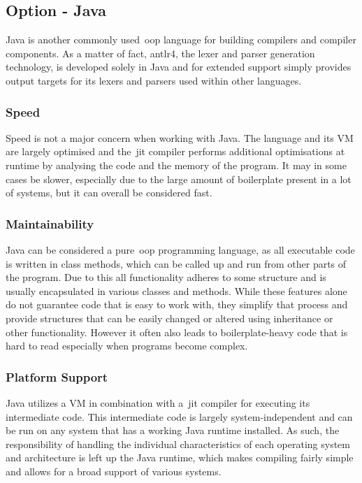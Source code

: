 \subsection{Option - Java}
\label{sec:programming-language-option-java}

Java is another commonly used~\acrshort{oop} language for building compilers and compiler components. As a matter of fact, \Gls{antlr4}, the lexer and parser generation technology, is developed solely in Java and for extended support simply provides output targets for its lexers and parsers used within other languages.

\subsubsection{Speed}

Speed is not a major concern when working with Java. The language and its VM are largely optimised and the~\acrshort{jit} compiler performs additional optimisations at runtime by analysing the code and the memory of the program. It may in some cases be slower, especially due to the large amount of boilerplate present in a lot of systems, but it can overall be considered fast.

\subsubsection{Maintainability}

Java can be considered a pure~\acrshort{oop} programming language, as all executable code is written in class methods, which can be called up and run from other parts of the program. Due to this all functionality adheres to some structure and is usually encapsulated in various classes and methods. While these features alone do not guarantee code that is easy to work with, they simplify that process and provide structures that can be easily changed or altered using inheritance or other functionality. However it often also leads to boilerplate-heavy code that is hard to read especially when programs become complex.

\subsubsection{Platform Support}

Java utilizes a VM in combination with a~\acrshort{jit} compiler for executing its intermediate code. This intermediate code is largely system-independent and can be run on any system that has a working Java runtime installed. As such, the responsibility of handling the individual characteristics of each operating system and architecture is left up the Java runtime, which makes compiling fairly simple and allows for a broad support of various systems.

